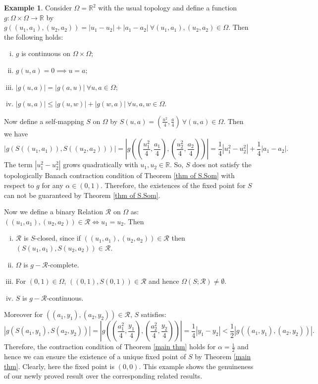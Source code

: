 \documentclass[10pt, reqno]{amsart}
\theoremstyle{definition}
\newtheorem{example}[theorem]{Example}
\theoremstyle{remark}
\numberwithin{equation}{section}
\begin{document}
\begin{example}
 Consider $ \Omega = \mathbb{R}^2 $ with the usual topology and define a function $   g : \Omega \times \Omega \to \mathbb{R} $ by  $ g( ( u_1, a_1 ), ( u_2, a_2 )  ) =  | u_1 - u_2 | + | a_1 - a_2 |  ~  \forall ( u_1, a_1 ), ( u_2, a_2 )  \in \Omega $.  
	Then  the following holds:
	\begin{enumerate}[(i)]
		\item   $  g $  is continuous on $ \Omega \times \Omega $;
            \item  $ g ( u, a ) = 0 \implies u = a $;
		\item $ | g( u, a )| = | g( a, u  )| ~  \forall u, a \in \Omega $;
		\item $  |g( u, a )| \leq | g (  u, w )| + | g( w, a )| ~ \forall u, a, w \in \Omega $.
	\end{enumerate}
%
	Now define a self-mapping $ S $ on $ \Omega $ by $ S ( u, a  ) = ( \frac{u^2}{4}, \frac{ a }{4}) ~ \forall ( u, a ) \in \Omega $. Then we have
	$$ | g ( S ( ( u_1, a_1 ) ), S ( ( u_2, a_2 ) ) ) | = \left| g\left( ( \frac{ u_1^2}{4}, \frac{ a_1}{4}) , ( \frac{u_2 ^2}{4}, \frac{a_2}{4}) \right) \right| = \frac{1}{4} | u_1 ^2 - u_2 ^2 | + \frac{1}{4} |a_1 - a_2 |.
  $$
	The term $ | u_1 ^2 - u_2 ^2 | $ grows quadratically with $ u_1, u_2 \in \mathbb{R} $. So, $ S $ does not satisfy the topologically Banach contraction condition of Theorem \ref{thm of S.Som} with respect to $g$ for any    $ \alpha \in ( 0, 1 ) $.  Therefore,  the existences of   the fixed point for $ S $ can not be guaranteed by   Theorem \ref{thm of S.Som}.  
     
	Now we define a binary Relation $ \mathcal{R} $ on $ \Omega $ as: $  ( ( u_1, a_1 ), ( u_2, a_2 ) ) \in    \mathcal{R} \iff  u_1 = u_2 $.  
	Then   
	\begin{enumerate}[(i)]
		\item $  \mathcal{R} $ is  $ S $-closed, since if $ ( ( u_1, a_1 ), ( u_2, a_2 ) ) \in \mathcal{R} $ then $  ( S ( u_1, a_1 ), S ( u_2, a_2 ) ) \in \mathcal{R} $.
		\item $ \Omega $ is $ g-\mathcal{R} $-complete.
		\item For   $ (0, 1) \in \Omega $, $ ( ( 0, 1 ), S (0, 1) ) \in \mathcal{R} $ and hence  $ \Omega ( S; \mathcal{R}) \neq \emptyset $.  
		\item $ S $ is $  g-\mathcal{R} $-continuous.
	\end{enumerate}
	 
     Moreover  for $    ( ( a_1, y_1 ),  ( a_2, y_2 ) ) \in \mathcal{R} $,   $ S $ satisfies:
     $$ | g ( S  ( a_1, y_1  ), S (  a_2, y_2 )  ) | = \left| g\left( \left( \frac{a_1^2}{4}, \frac{y_1}{4} \right) , \left( \frac{a_2 ^2}{4}, \frac{y_2}{4} \right) \right) \right| =  \frac{1}{4} | y_1 - y_2 | < \frac{1}{2} | g ( ( a_1, y_1 ), ( a_2, y_2 ) ) |.  $$
     Therefore, the contraction condition of  Theorem \ref{main thm} holds for $ \alpha  = \frac{1}{2} $ and hence we can ensure the existence of a unique fixed point of $ S $  by Theorem  \ref{main thm}.
	Clearly,  here the fixed point is $ ( 0, 0) $.  This example shows the genuineness of our newly proved result over the corresponding related results.
	

\end{example}
\end{document}

